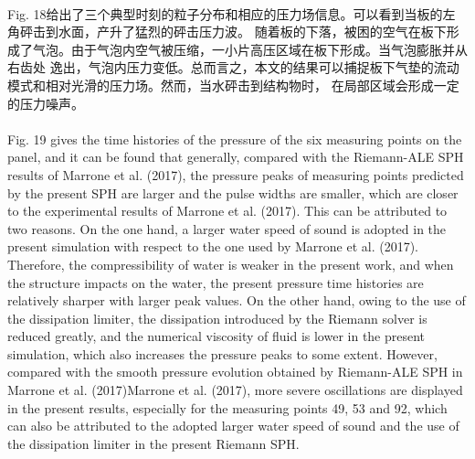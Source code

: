 \documentclass[UTF8]{ctexart}
\begin{document}
\paragraph{\quad}Fig. 18给出了三个典型时刻的粒子分布和相应的压力场信息。可以看到当板的左角砰击到水面，产升了猛烈的砰击压力波。
                随着板的下落，被困的空气在板下形成了气泡。由于气泡内空气被压缩，一小片高压区域在板下形成。当气泡膨胀并从右齿处
                逸出，气泡内压力变低。总而言之，本文的结果可以捕捉板下气垫的流动模式和相对光滑的压力场。然而，当水砰击到结构物时，
                在局部区域会形成一定的压力噪声。

\paragraph{\quad}Fig. 19 gives the time histories of the pressure of the six measuring points on the panel, 
                and it can be found that generally, compared with the Riemann-ALE SPH results of 
                Marrone et al. (2017), the pressure peaks of measuring points predicted by the present 
                SPH are larger and the pulse widths are smaller, which are closer to the experimental 
                results of Marrone et al. (2017). This can be attributed to two reasons. On the one hand, 
                a larger water speed of sound is adopted in the present simulation with respect to the one 
                used by Marrone et al. (2017). Therefore, the compressibility of water is weaker in the 
                present work, and when the structure impacts on the water, the present pressure time histories 
                are relatively sharper with larger peak values. On the other hand, owing to the use of the 
                dissipation limiter, the dissipation introduced by the Riemann solver is reduced greatly, and 
                the numerical viscosity of fluid is lower in the present simulation, which also increases the 
                pressure peaks to some extent. However, compared with the smooth pressure evolution obtained 
                by Riemann-ALE SPH in Marrone et al. (2017)Marrone et al. (2017), more severe oscillations are 
                displayed in the present results, especially for the measuring points 49, 53 and 92, which can 
                also be attributed to the adopted larger water speed of sound and the use of the dissipation 
                limiter in the present Riemann SPH.
\end{document}
